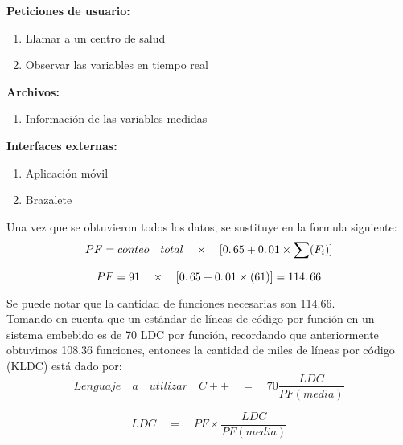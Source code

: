 \textbf{Peticiones de usuario:} \\

\begin{enumerate}
	\item Llamar a un centro de salud
	\item Observar las variables en tiempo real
\end{enumerate}

\textbf{Archivos:} \\

\begin{enumerate}
	\item Información de las variables medidas
\end{enumerate}

\textbf{Interfaces externas:} \\

\begin{enumerate}
	\item Aplicación móvil
	\item Brazalete
\end{enumerate}

Una vez que se obtuvieron todos los datos, se sustituye en la formula siguiente: \\

\begin{equation}
PF = conteo \quad total \quad \times \quad[0\ldotp65 + 0\ldotp01 \times \sum(F_i)]
\end{equation}

\begin{equation}
PF = 91 \quad \times \quad[0\ldotp65 + 0\ldotp01 \times (61)] = 114\ldotp66
\end{equation}

Se puede notar que la cantidad de funciones necesarias son 114.66. \\

Tomando en cuenta que un estándar de líneas de código por función en un sistema embebido es de 70 LDC por función, recordando que anteriormente obtuvimos 108.36 funciones, entonces la cantidad de miles de líneas por código (KLDC) está dado por: \\

\begin{equation}
	Lenguaje \quad a \quad utilizar \quad C++ \quad = \quad 70 \frac{LDC}{PF(media)} 
\end{equation}

\begin{equation}
	LDC \quad = \quad PF \times \frac{LDC}{PF(media)}
\end{equation}

